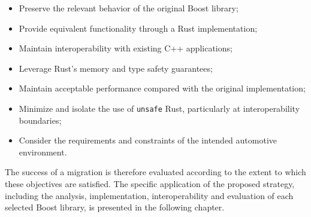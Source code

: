 \begin{itemize}
\item Preserve the relevant behavior of the original Boost library;
\item Provide equivalent functionality through a Rust implementation;
\item Maintain interoperability with existing C++ applications;
\item Leverage Rust's memory and type safety guarantees;
\item Maintain acceptable performance compared with the original implementation;
\item Minimize and isolate the use of \texttt{unsafe} Rust, particularly at interoperability boundaries;
\item Consider the requirements and constraints of the intended automotive environment.
\end{itemize}

The success of a migration is therefore evaluated according to the extent to which these objectives are satisfied. 
The specific application of the proposed strategy, including the analysis, implementation, interoperability and 
evaluation of each selected Boost library, is presented in the following chapter.
